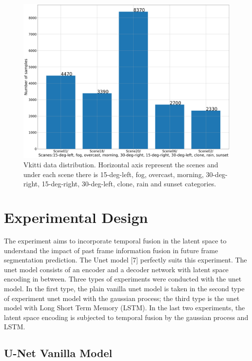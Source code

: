 	\begin{figure}
		\centering
		\includegraphics[width=14cm]{images/vkitti_scanes_samples.png}
		\caption{Vkitti data distribution. Horizontal axis represent the scenes and under each scene there is 15-deg-left, fog, overcast, morning, 30-deg-right, 15-deg-right, 30-deg-left, clone, rain and sunset categories.}
		\label{fig:scannet_vkitti}
	\end{figure}	
	
    \section{Experimental Design}
    
    The experiment aims to incorporate temporal fusion in the latent space to understand the impact of past frame information fusion in future frame segmentation prediction. The Unet model [7] perfectly suits this experiment. The unet model consists of an encoder and a decoder network with latent space encoding in between. Three types of experiments were conducted with the unet model. In the first type, the plain vanilla unet model is taken in the second type of experiment unet model with the gaussian process; the third type is the unet model with Long Short Term Memory (LSTM). In the last two experiments, the latent space encoding is subjected to temporal fusion by the gaussian process and LSTM.   
    
    \subsection{U-Net Vanilla Model}
    

